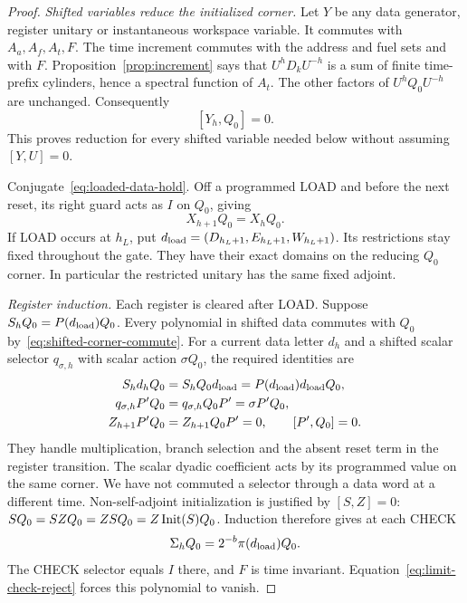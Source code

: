 \begin{proof}
\emph{Shifted variables reduce the initialized corner.} Let $Y$ be any data generator, register unitary or instantaneous workspace variable. It commutes with $A_a,A_f,A_t,F$. The time increment commutes with the address and fuel sets and with $F$. Proposition~\ref{prop:increment} says that $U^hD_kU^{-h}$ is a sum of finite time-prefix cylinders, hence a spectral function of $A_t$. The other factors of $U^hQ_0U^{-h}$ are unchanged. Consequently
\begin{equation}\label{eq:shifted-corner-commute}
 [Y_h,Q_0]=0.
\end{equation}
This proves reduction for every shifted variable needed below without assuming $[Y,U]=0$.

Conjugate~\eqref{eq:loaded-data-hold}. Off a programmed LOAD and before the next reset, its right guard acts as $I$ on $Q_0$, giving
\begin{equation}\label{eq:one-loaded-tuple}
 X_{h+1}Q_0=X_hQ_0.
\end{equation}
If LOAD occurs at $h_L$, put $d_{\rm load}=(D_{h_L+1},E_{h_L+1},W_{h_L+1})$. Its restrictions stay fixed throughout the gate. They have their exact domains on the reducing $Q_0$ corner. In particular the restricted unitary has the same fixed adjoint.

\emph{Register induction.} Each register is cleared after LOAD. Suppose $S_hQ_0=P(d_{\rm load})Q_0$. Every polynomial in shifted data commutes with $Q_0$ by~\eqref{eq:shifted-corner-commute}. For a current data letter $d_h$ and a shifted scalar selector $q_{\sigma,h}$ with scalar action $\sigma Q_0$, the required identities are
\begin{align*}
 S_hd_hQ_0&=S_hQ_0d_{\rm load}
             =P(d_{\rm load})d_{\rm load}Q_0,\\
 q_{\sigma,h}P'Q_0&=q_{\sigma,h}Q_0P'=\sigma P'Q_0,\\
 Z_{h+1}P'Q_0&=Z_{h+1}Q_0P'=0,
 \qquad [P',Q_0]=0.
\end{align*}
They handle multiplication, branch selection and the absent reset term in the register transition. The scalar dyadic coefficient acts by its programmed value on the same corner. We have not commuted a selector through a data word at a different time. Non-self-adjoint initialization is justified by $[S,Z]=0$: $SQ_0=SZQ_0=ZS Q_0=Z\operatorname{Init}(S)Q_0$. Induction therefore gives at each CHECK
\begin{equation}\label{eq:loaded-register-evaluation}
 \Sigma_hQ_0=2^{-b}\pi(d_{\rm load})Q_0.
\end{equation}
The CHECK selector equals $I$ there, and $F$ is time invariant. Equation~\eqref{eq:limit-check-reject} forces this polynomial to vanish.


\end{proof}
